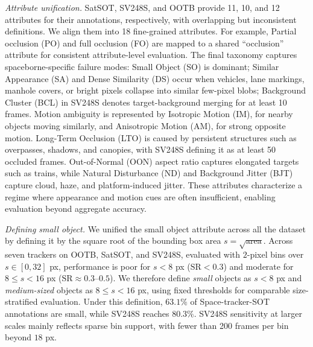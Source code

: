 \documentclass{article}
\begin{document}
\noindent \textit{Attribute unification.} SatSOT, SV248S, and OOTB provide 11, 10, and 12 attributes for their annotations, respectively, with overlapping but inconsistent definitions. We align them into 18 fine-grained attributes. For example, Partial occlusion (PO) and full occlusion (FO) are mapped to a shared ``occlusion'' attribute for consistent attribute-level evaluation. The final taxonomy captures spaceborne-specific failure modes: Small Object (SO) is dominant; Similar Appearance (SA) and Dense Similarity (DS) occur when vehicles, lane markings, manhole covers, or bright pixels collapse into similar few-pixel blobs; Background Cluster (BCL) in SV248S denotes target-background merging for at least 10 frames. Motion ambiguity is represented by Isotropic Motion (IM), for nearby objects moving similarly, and Anisotropic Motion (AM), for strong opposite motion. Long-Term Occlusion (LTO) is caused by persistent structures such as overpasses, shadows, and canopies, with SV248S defining it as at least 50 occluded frames. Out-of-Normal (OON) aspect ratio captures elongated targets such as trains, while Natural Disturbance (ND) and Background Jitter (BJT) capture cloud, haze, and platform-induced jitter. These attributes characterize a regime where appearance and motion cues are often insufficient, enabling evaluation beyond aggregate accuracy.

\noindent\textit{Defining small object.}
We unified the small object attribute across all the dataset by defining it by the square root of the bounding box area \(s=\sqrt{\mathrm{area}}\). Across seven trackers on OOTB, SatSOT, and SV248S, evaluated with \(2\)-pixel bins over \(s\in[0,32]\) px, performance is poor for \(s<8\) px (\(\mathrm{SR}<0.3\)) and moderate for \(8\le s<16\) px (\(\mathrm{SR}\approx0.3\text{--}0.5\)). We therefore define \emph{small} objects as \(s<8\) px and \emph{medium-sized} objects as \(8\le s<16\) px, using fixed thresholds for comparable size-stratified evaluation. Under this definition, \(63.1\%\) of Space-tracker-SOT annotations are small, while SV248S reaches \(80.3\%\). SV248S sensitivity at larger scales mainly reflects sparse bin support, with fewer than 200 frames per bin beyond \(18\) px.
\end{document}
